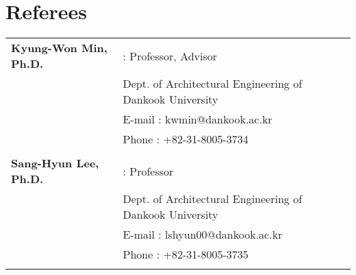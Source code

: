 \section*{Referees}
\begin{tabularx}{\textwidth}{p{}X}
    \textbf{Kyung-Won Min, Ph.D.} & : Professor, Advisor \\
    & Dept. of Architectural Engineering of Dankook University \\
    & E-mail : kwmin@dankook.ac.kr \\
    & Phone : +82-31-8005-3734 \\
    \\
    \textbf{Sang-Hyun Lee, Ph.D.} & : Professor \\
    & Dept. of Architectural Engineering of Dankook University \\
    & E-mail : lshyun00@dankook.ac.kr \\
    & Phone : +82-31-8005-3735 \\
    \\
\end{tabularx}
